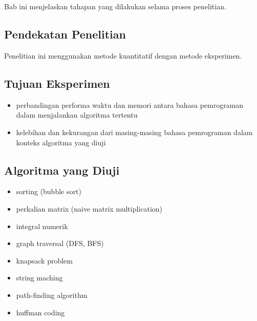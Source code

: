 \chapter{\babTiga}
\label{bab:3}
Bab ini menjelaskan tahapan yang dilakukan selama proses penelitian.



\section{Pendekatan Penelitian}
\label{sec:pendekatanPenelitian}
Penelitian ini menggunakan metode kuantitatif dengan metode eksperimen.

\section{Tujuan Eksperimen}
\label{sec:tujuanEksperimen}
\begin{itemize}
	\item perbandingan performa waktu dan memori antara bahasa pemrograman dalam menjalankan algoritma tertentu
	\item kelebihan dan kekurangan dari masing-masing bahasa pemrograman dalam konteks algoritma yang diuji
\end{itemize}

\section{Algoritma yang Diuji}
\label{sec:algoritmaDiuji}
\begin{itemize}
	\item sorting (bubble sort)
	\item perkalian matrix (naive matrix multiplication)
	\item integral numerik
	\item graph traversal (DFS, BFS)
	\item knapsack problem
	\item string maching
	\item path-finding algorithm
	\item huffman coding
\end{itemize}

